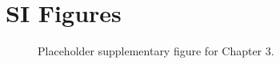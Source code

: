 \section{SI Figures}

\begin{figure}[htbp]
  \caption{Placeholder supplementary figure for Chapter 3.}
  \label{fig:ch3-si-fig1}
\end{figure}
